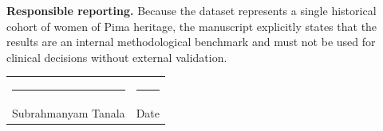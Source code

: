 \documentclass[11pt]{article}
\begin{document}
\textbf{Responsible reporting.} Because the dataset represents a single historical cohort of women of Pima heritage, the manuscript explicitly states that the results are an internal methodological benchmark and must not be used for clinical decisions without external validation.

\vspace{2cm}
\begin{tabular}{@{}p{7cm}p{6cm}@{}}
\rule{6cm}{0.4pt} & \rule{5cm}{0.4pt} \\
Subrahmanyam Tanala & Date
\end{tabular}
\end{document}
